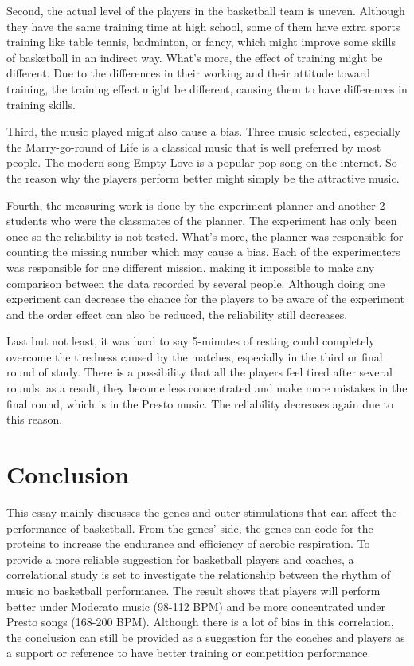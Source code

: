 \documentclass[man,floatsintext]{apa7}
\begin{document}
Second, the actual level of the players in the basketball team is uneven. Although they have the same training time at high school, some of them have extra sports training like table tennis, badminton, or fancy, which might improve some skills of basketball in an indirect way. What's more, the effect of training might be different. Due to the differences in their working and their attitude toward training, the training effect might be different, causing them to have differences in training skills. 

Third, the music played might also cause a bias. Three music selected, especially the Marry-go-round of Life is a classical music that is well preferred by most people. The modern song Empty Love is a popular pop song on the internet. So the reason why the players perform better might simply be the attractive music. 

Fourth, the measuring work is done by the experiment planner and another 2 students who were the classmates of the planner. The experiment has only been once so the reliability is not tested. What's more, the planner was responsible for counting the missing number which may cause a bias. Each of the experimenters was responsible for one different mission, making it impossible to make any comparison between the data recorded by several people. Although doing one experiment can decrease the chance for the players to be aware of the experiment and the order effect can also be reduced, the reliability still decreases.

Last but not least, it was hard to say 5-minutes of resting could completely overcome the tiredness caused by the matches, especially in the third or final round of study. There is a possibility that all the players feel tired after several rounds, as a result, they become less concentrated and make more mistakes in the final round, which is in the Presto music. The reliability decreases again due to this reason.

\section{Conclusion}

This essay mainly discusses the genes and outer stimulations that can affect the performance of basketball. From the genes' side, the genes can code for the proteins to increase the endurance and efficiency of aerobic respiration. To provide a more reliable suggestion for basketball players and coaches, a correlational study is set to investigate the relationship between the rhythm of music no basketball performance. The result shows that players will perform better under Moderato music (98-112 BPM) and be more concentrated under Presto songs (168-200 BPM). Although there is a lot of bias in this correlation, the conclusion can still be provided as a suggestion for the coaches and players as a support or reference to have better training or competition performance.
\newpage
\printbibliography{}
\end{document}
